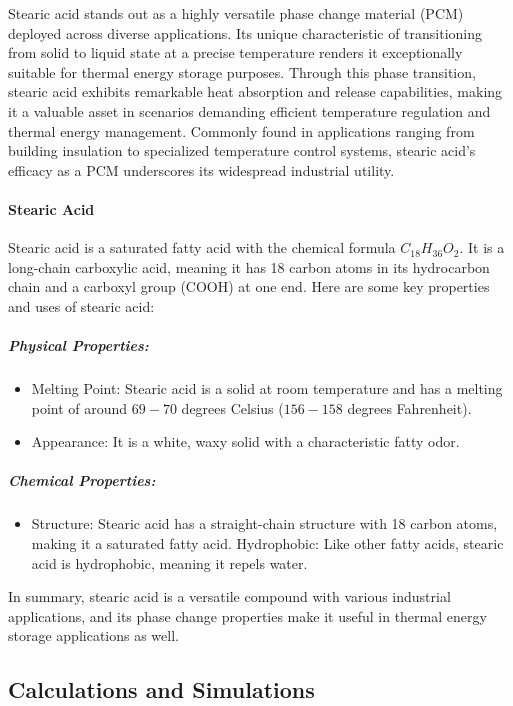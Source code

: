 Stearic acid stands out as a highly versatile phase change material (PCM) deployed across diverse applications. Its unique characteristic of transitioning from solid to liquid state at a precise temperature renders it exceptionally suitable for thermal energy storage purposes. Through this phase transition, stearic acid exhibits remarkable heat absorption and release capabilities, making it a valuable asset in scenarios demanding efficient temperature regulation and thermal energy management. Commonly found in applications ranging from building insulation to specialized temperature control systems, stearic acid's efficacy as a PCM underscores its widespread industrial utility.

\paragraph{Stearic Acid}
Stearic acid is a saturated fatty acid with the chemical formula \( C_{18}H_{36}O_2 \). It is a long-chain carboxylic acid, meaning it has 18 carbon atoms in its hydrocarbon chain and a carboxyl group (COOH) at one end. Here are some key properties and uses of stearic acid:

\subparagraph{Physical Properties:}
\begin{itemize}
  \item Melting Point: Stearic acid is a solid at room temperature and has a melting point of around \( 69-70 \) degrees Celsius (\( 156-158 \) degrees Fahrenheit).
  \item Appearance: It is a white, waxy solid with a characteristic fatty odor.
\end{itemize}

\subparagraph{Chemical Properties:}
\begin{itemize}
  \item Structure: Stearic acid has a straight-chain structure with 18 carbon atoms, making it a saturated fatty acid. Hydrophobic: Like other fatty acids, stearic acid is hydrophobic, meaning it repels water.
\end{itemize}

In summary, stearic acid is a versatile compound with various industrial applications, and its phase change properties make it useful in thermal energy storage applications as well.

\subsection{Calculations and Simulations}

